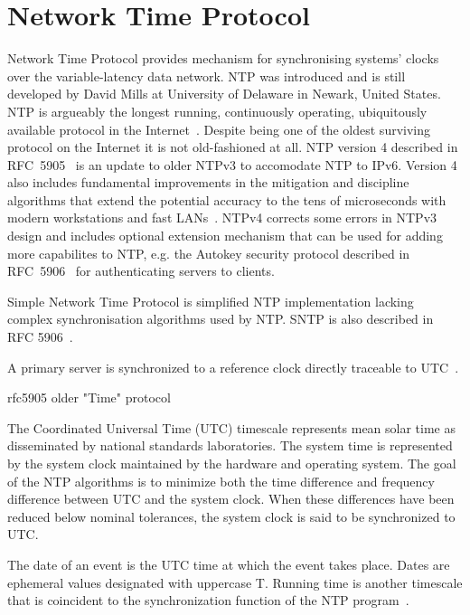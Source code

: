 
\chapter{Network Time Protocol}
Network Time Protocol provides mechanism for synchronising systems' clocks over the variable-latency data network.
NTP was introduced and is still developed by David Mills at University of Delaware in Newark, United States.
NTP is argueably the longest running, continuously operating,
ubiquitously available protocol in the Internet~\cite{ntp-overview}.
Despite being one of the oldest surviving protocol on the Internet it is not old-fashioned at all.
NTP version 4 described in RFC~5905~\cite{rfc5905} is an update to older NTPv3 to accomodate NTP to IPv6.
Version 4 also includes fundamental improvements in
the mitigation and discipline algorithms that extend
the potential accuracy to the tens of microseconds with modern
workstations and fast LANs~\cite{rfc5905}.
NTPv4 corrects some
errors in NTPv3 design and includes optional extension mechanism
that can be used for adding more capabilites to NTP, e.g. the
Autokey security protocol described in RFC~5906~\cite{rfc5906}
for authenticating servers to clients.

Simple Network Time Protocol is simplified NTP implementation lacking complex
synchronisation algorithms used by NTP. SNTP is also described in RFC 5906~\cite{rfc5906}.

A primary server is synchronized to a reference clock directly traceable
to UTC~\cite{rfc5905}.

\! 
\! rfc5905
\! older "Time" protocol


The Coordinated Universal Time (UTC) timescale represents mean solar
   time as disseminated by national standards laboratories.  The system
   time is represented by the system clock maintained by the hardware
   and operating system.  The goal of the NTP algorithms is to minimize
   both the time difference and frequency difference between UTC and the
   system clock.  When these differences have been reduced below nominal
   tolerances, the system clock is said to be synchronized to UTC.



   The date of an event is the UTC time at which the event takes place.
   Dates are ephemeral values designated with uppercase T.  Running time
   is another timescale that is coincident to the synchronization
   function of the NTP program~\cite{rfc5905}.



